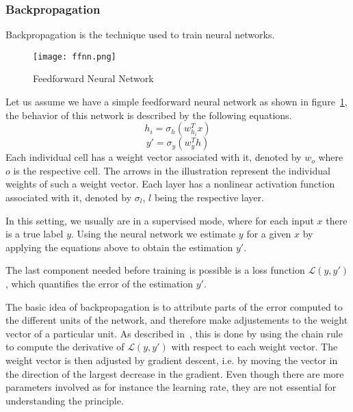 \subsubsection{Backpropagation}
Backpropagation is the technique used to train neural networks.
\begin{figure}[ht]
	\centering
	\captionsetup{width=0.8\textwidth}
    \texttt{[image: ffnn.png]}
    \caption{Feedforward Neural Network}
    \label{fig:ffnn}
\end{figure}
Let us assume we have a simple feedforward neural network as shown in figure~\ref{fig:ffnn}, the behavior of this network is described by the following equations.
\begin{equation}\label{eq:ffnn_hidden_layer}
    h_i = \sigma_h(w_{h_i}^Tx)
\end{equation}
\begin{equation}\label{eq:ffnn_output}
    y' = \sigma_y(w_{y}^Th)
\end{equation}
Each individual cell has a weight vector associated with it, denoted by $w_o$ where $o$ is the respective cell.
The arrows in the illustration represent the individual weights of such a weight vector.
Each layer has a nonlinear activation function associated with it, denoted by $\sigma_l$, $l$ being the respective layer.
\par
In this setting, we usually are in a supervised mode, where for each input $x$ there is a true label $y$.
Using the neural network we estimate $y$ for a given $x$ by applying the equations above to obtain the estimation $y'$.
\par
The last component needed before training is possible is a loss function $\mathcal{L}(y, y')$, which quantifies the error of the estimation $y'$.
\par
The basic idea of backpropagation is to attribute parts of the error computed to the different units of the network, and therefore make adjustements to the weight vector of a particular unit.
As described in~\cite{rnn_survey}, this is done by using the chain rule to compute the derivative of $\mathcal{L}(y, y')$ with respect to each weight vector.
The weight vector is then adjusted by gradient descent, i.e. by moving the vector in the direction of the largest decrease in the gradient.
Even though there are more parameters involved as for instance the learning rate, they are not essential for understanding the principle.
